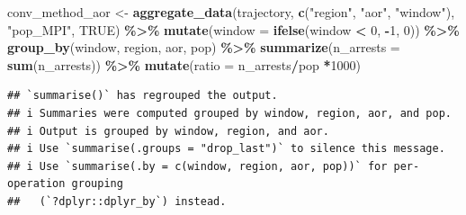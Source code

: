 \documentclass[
]{article}
\newenvironment{Shaded}{\begin{snugshade}}{\end{snugshade}}
\newcommand{\AttributeTok}[1]{\textcolor[rgb]{0.13,0.29,0.53}{#1}}
\newcommand{\ConstantTok}[1]{\textcolor[rgb]{0.56,0.35,0.01}{#1}}
\newcommand{\DecValTok}[1]{\textcolor[rgb]{0.00,0.00,0.81}{#1}}
\newcommand{\FunctionTok}[1]{\textcolor[rgb]{0.13,0.29,0.53}{\textbf{#1}}}
\newcommand{\NormalTok}[1]{#1}
\newcommand{\OtherTok}[1]{\textcolor[rgb]{0.56,0.35,0.01}{#1}}
\newcommand{\SpecialCharTok}[1]{\textcolor[rgb]{0.81,0.36,0.00}{\textbf{#1}}}
\newcommand{\StringTok}[1]{\textcolor[rgb]{0.31,0.60,0.02}{#1}}
\begin{document}
\begin{Shaded}
\begin{Highlighting}[]
\NormalTok{conv\_method\_aor }\OtherTok{\textless{}{-}} \FunctionTok{aggregate\_data}\NormalTok{(trajectory, }\FunctionTok{c}\NormalTok{(}\StringTok{"region"}\NormalTok{, }\StringTok{"aor"}\NormalTok{, }\StringTok{"window"}\NormalTok{), }\StringTok{"pop\_MPI"}\NormalTok{, }\ConstantTok{TRUE}\NormalTok{) }\SpecialCharTok{\%\textgreater{}\%}
  \FunctionTok{mutate}\NormalTok{(}\AttributeTok{window =} \FunctionTok{ifelse}\NormalTok{(window }\SpecialCharTok{\textless{}} \DecValTok{0}\NormalTok{, }\SpecialCharTok{{-}}\DecValTok{1}\NormalTok{, }\DecValTok{0}\NormalTok{)) }\SpecialCharTok{\%\textgreater{}\%}
  \FunctionTok{group\_by}\NormalTok{(window, region, aor, pop) }\SpecialCharTok{\%\textgreater{}\%}
  \FunctionTok{summarize}\NormalTok{(}\AttributeTok{n\_arrests =} \FunctionTok{sum}\NormalTok{(n\_arrests)) }\SpecialCharTok{\%\textgreater{}\%}
  \FunctionTok{mutate}\NormalTok{(}\AttributeTok{ratio =}\NormalTok{ n\_arrests}\SpecialCharTok{/}\NormalTok{pop }\SpecialCharTok{*}\DecValTok{1000}\NormalTok{)}
\end{Highlighting}
\end{Shaded}

\begin{verbatim}
## `summarise()` has regrouped the output.
## i Summaries were computed grouped by window, region, aor, and pop.
## i Output is grouped by window, region, and aor.
## i Use `summarise(.groups = "drop_last")` to silence this message.
## i Use `summarise(.by = c(window, region, aor, pop))` for per-operation grouping
##   (`?dplyr::dplyr_by`) instead.
\end{verbatim}
\end{document}
